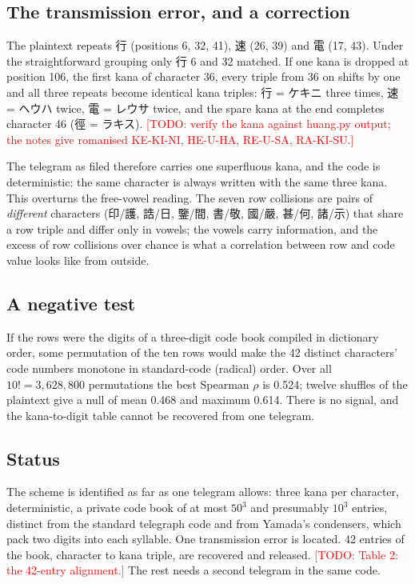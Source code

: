 \documentclass[11pt]{article}
\newcommand{\todo}[1]{\textcolor{red}{[TODO: #1]}}
\begin{document}
\subsection{The transmission error, and a correction}

The plaintext repeats 行 (positions 6, 32, 41), 速 (26, 39) and 電 (17, 43). Under the straightforward grouping only 行 6 and 32 matched. If one kana is dropped at position 106, the first kana of character 36, every triple from 36 on shifts by one and all three repeats become identical kana triples: 行 = ケキニ three times, 速 = ヘウハ twice, 電 = レウサ twice, and the spare kana at the end completes character 46 (徑 = ラキス). \todo{verify the kana against huang.py output; the notes give romanised KE-KI-NI, HE-U-HA, RE-U-SA, RA-KI-SU.}

The telegram as filed therefore carries one superfluous kana, and the code is deterministic: the same character is always written with the same three kana. This overturns the free-vowel reading. The seven row collisions are pairs of \emph{different} characters (印/護, 誥/日, 鑒/間, 書/敬, 國/嚴, 甚/何, 諸/示) that share a row triple and differ only in vowels; the vowels carry information, and the excess of row collisions over chance is what a correlation between row and code value looks like from outside.

\subsection{A negative test}

If the rows were the digits of a three-digit code book compiled in dictionary order, some permutation of the ten rows would make the 42 distinct characters' code numbers monotone in standard-code (radical) order. Over all $10! = 3{,}628{,}800$ permutations the best Spearman $\rho$ is 0.524; twelve shuffles of the plaintext give a null of mean 0.468 and maximum 0.614. There is no signal, and the kana-to-digit table cannot be recovered from one telegram.

\subsection{Status}

The scheme is identified as far as one telegram allows: three kana per character, deterministic, a private code book of at most $50^3$ and presumably $10^3$ entries, distinct from the standard telegraph code and from Yamada's condensers, which pack two digits into each syllable. One transmission error is located. 42 entries of the book, character to kana triple, are recovered and released. \todo{Table 2: the 42-entry alignment.} The rest needs a second telegram in the same code.
\end{document}
